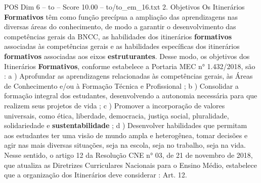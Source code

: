 \begin{textsample}{POS Dim 6 – to – Score 10.00 – to/to\_em\_16.txt}  \label{ex:f6_pos_171}
2.
Objetivos Os Itinerários \textbf{Formativos} têm como função precípua a ampliação das aprendizagens nas diversas áreas do conhecimento, de modo a garantir o desenvolvimento das competências gerais da BNCC, as habilidades dos itinerários \textbf{formativos} associadas às competências gerais e as habilidades específicas dos itinerários \textbf{formativos} associadas aos eixos \textbf{estruturantes}.
Desse modo, os objetivos dos Itinerários \textbf{Formativos}, conforme estabelece a Portaria MEC n{\EmojiFont °} 1.432/2018, são : a ) Aprofundar as aprendizagens relacionadas às competências gerais, às Áreas de Conhecimento e/ou à Formação Técnica e Profissional ; b ) Consolidar a formação integral dos estudantes, desenvolvendo a autonomia necessária para que realizem seus projetos de vida ; c ) Promover a incorporação de valores universais, como ética, liberdade, democracia, justiça social, pluralidade, solidariedade e \textbf{sustentabilidade} ; d ) Desenvolver habilidades que permitam aos estudantes ter uma visão de mundo ampla e heterogênea, tomar decisões e agir nas mais diversas situações, seja na escola, seja no trabalho, seja na vida.
Nesse sentido, o artigo 12 da Resolução CNE n{\EmojiFont °} 03, de 21 de novembro de 2018, que atualiza as Diretrizes Curriculares Nacionais para o Ensino Médio, estabelece que a organização dos Itinerários deve considerar : Art. 12.

\end{textsample}
